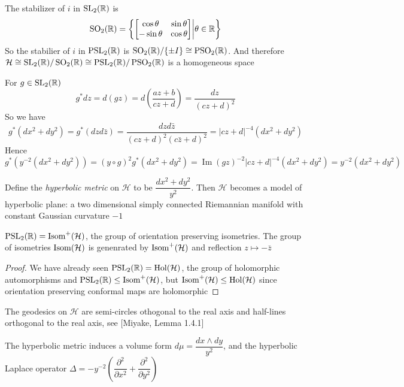 \documentclass[main.tex]{subfiles}
\begin{document}
\begin{exercise}
The stabilizer of $i$ in $\operatorname{SL}_2(\mathbb R)$ is
\[\operatorname{SO}_2(\mathbb R)=\left\{\begin{bmatrix}
\cos\theta&\sin\theta \\
-\sin\theta&\cos\theta
\end{bmatrix}\middle|\theta\in\mathbb R\right\}\]
So the stabilier of $i$ in $\operatorname{PSL}_2(\mathbb R)$ is $\operatorname{SO}_2(\mathbb R)/\{\pm I\}\cong\operatorname{PSO}_2(\mathbb R)$. And therefore $\mathcal H\cong \operatorname{SL}_2(\mathbb R)/\operatorname{SO}_2(\mathbb R)\cong\operatorname{PSL}_2(\mathbb R)/\operatorname{PSO}_2(\mathbb R)$ is a homogeneous space
\end{exercise}

\begin{exercise}
For $g\in\operatorname{SL}_2(\mathbb R)$
\[
g^*dz=d(gz)=d\left(\frac{az+b}{cz+d}\right)=\frac{dz}{(cz+d)^2}
\]
So we have
\[
g^*(dx^2+dy^2)=g^*(dzd\bar z)=\frac{dzd\bar z}{(cz+d)^2(c\bar z+d)^2}=|cz+d|^{-4}(dx^2+dy^2)
\]
Hence
\[
g^*(y^{-2}(dx^2+dy^2))=(y\circ g)^2g^*(dx^2+dy^2)=\operatorname{Im}(gz)^{-2}|cz+d|^{-4}(dx^2+dy^2)=y^{-2}(dx^2+dy^2)
\]
\end{exercise}

\begin{definition}
Define the \textit{hyperbolic metric} on $\mathcal H$ to be $\dfrac{dx^2+dy^2}{y^2}$. Then $\mathcal H$ becomes a model of hyperbolic plane: a two dimensional simply connected Riemannian manifold with constant Gaussian curvature $-1$
\end{definition}

\begin{proposition}
$\operatorname{PSL}_2(\mathbb R)=\operatorname{Isom}^+(\mathcal H)$, the group of orientation preserving isometries. The group of isometries $\operatorname{Isom}(\mathcal H)$ is genenrated by $\operatorname{Isom}^+(\mathcal H)$ and reflection $z\mapsto-\bar z$
\end{proposition}

\begin{proof}
We have already seen $\operatorname{PSL}_2(\mathbb R)=\operatorname{Hol}(\mathcal H)$, the group of holomorphic automorphisms and $\operatorname{PSL}_2(\mathbb R)\leq\operatorname{Isom}^+(\mathcal H)$, but $\operatorname{Isom}^+(\mathcal H)\leq\operatorname{Hol}(\mathcal H)$ since orientation preserving conformal maps are holomorphic
\end{proof}

\begin{fact}
The geodesics on $\mathcal H$ are semi-circles othogonal to the real axis and half-lines orthogonal to the real axis, see [Miyake, Lemma 1.4.1]
\begin{center}
\end{center}
The hyperbolic metric induces a volume form $d\mu=\dfrac{dx\wedge dy}{y^2}$, and the hyperbolic Laplace operator $\Delta=-y^{-2}\left(\dfrac{\partial^2}{\partial x^2}+\dfrac{\partial^2}{\partial y^2}\right)$
\end{fact}
\end{document}
